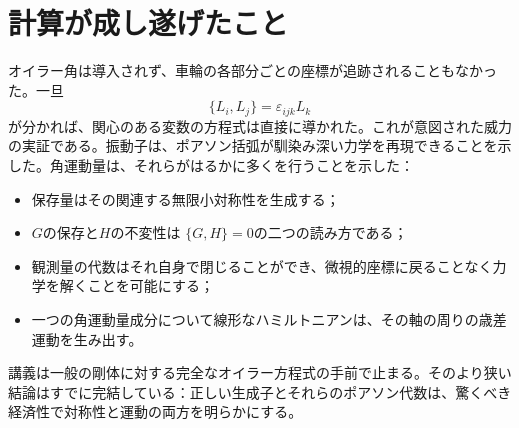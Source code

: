 \section{計算が成し遂げたこと}

オイラー角は導入されず、車輪の各部分ごとの座標が追跡されることもなかった。一旦
\[
  \{L_i,L_j\}=\varepsilon_{ijk}L_k
\]
が分かれば、関心のある変数の方程式は直接に導かれた。これが意図された威力の実証である。振動子は、ポアソン括弧が馴染み深い力学を再現できることを示した。角運動量は、それらがはるかに多くを行うことを示した：
\begin{itemize}
  \item 保存量はその関連する無限小対称性を生成する；
  \item \(G\)の保存と\(H\)の不変性は
  \(\{G,H\}=0\)の二つの読み方である；
  \item 観測量の代数はそれ自身で閉じることができ、微視的座標に戻ることなく力学を解くことを可能にする；
  \item 一つの角運動量成分について線形なハミルトニアンは、その軸の周りの歳差運動を生み出す。
\end{itemize}
講義は一般の剛体に対する完全なオイラー方程式の手前で止まる。そのより狭い結論はすでに完結している：正しい生成子とそれらのポアソン代数は、驚くべき経済性で対称性と運動の両方を明らかにする。